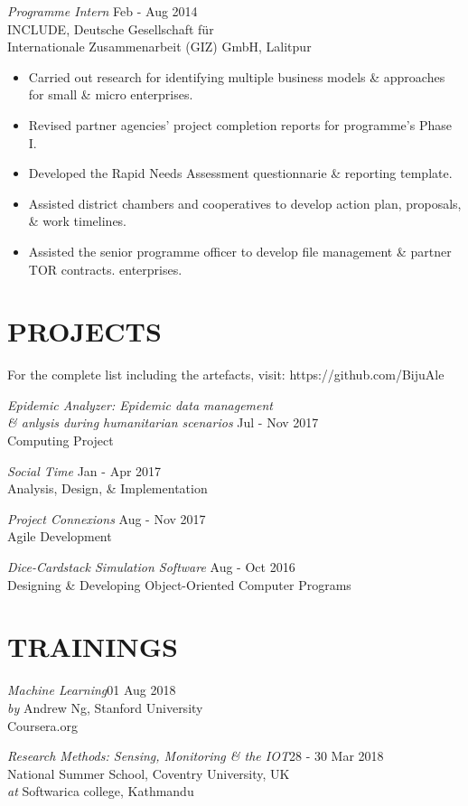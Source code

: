 \documentclass[margin, 10pt]{res}
\begin{document}
\begin{resume}
\emph{Programme Intern} \hfill Feb - Aug 2014\\
INCLUDE, Deutsche Gesellschaft für \\Internationale Zusammenarbeit (GIZ) GmbH, Lalitpur
\begin{itemize}
	\item Carried out research for identifying multiple business models \& approaches for small \& micro enterprises.
	\item Revised partner agencies' project completion reports for programme's Phase I.
	\item Developed the Rapid Needs Assessment questionnarie \& reporting template.
	\item Assisted district chambers and cooperatives to develop action plan, proposals, \& work timelines.
	\item Assisted the senior programme officer to develop file management \& partner TOR contracts.
	enterprises.
\end{itemize}

\section{PROJECTS}
For the complete list including the artefacts, visit: https://github.com/BijuAle

\emph{Epidemic Analyzer: Epidemic data management \\\& anlysis during humanitarian scenarios} \hfill Jul - Nov 2017\\
Computing Project

\emph{Social Time} \hfill Jan - Apr 2017\\
Analysis, Design, \& Implementation

\emph{Project Connexions} \hfill Aug - Nov 2017\\
Agile Development

\emph{Dice-Cardstack Simulation Software} \hfill Aug - Oct 2016\\
Designing \& Developing Object-Oriented Computer Programs

\section{TRAININGS}

\emph{Machine Learning}\hfill 01 Aug 2018\\
\emph{by} Andrew Ng, Stanford University\\
Coursera.org

\emph{Research Methods: Sensing, Monitoring \& the IOT}\hfill 28 - 30 Mar 2018\\
National Summer School, Coventry University, UK\\
\emph{at} Softwarica college, Kathmandu


\end{resume}
\end{document}
